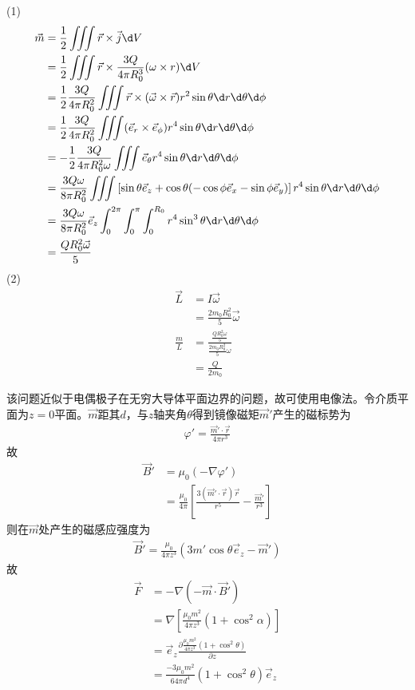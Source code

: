 \documentclass{phyasgn}
\begin{document}
\begin{sol}[2]
    (1)
    \begin{align*}
        \vec{m}&=\frac{1}{2}\iiint\vec{r}\times\vec{j}\d V\\
        &=\frac{1}{2}\iiint\vec{r}\times\frac{3Q}{4\pi R_0^3}(\omega\times r)\d V\\
        &=\frac{1}{2}\frac{3Q}{4\pi R_0^2}\iiint\vec{r}\times(\vec{\omega}\times\vec{r})r^2\sin\theta\d r\d\theta\d\phi\\
        &=\frac{1}{2}\frac{3Q}{4\pi R_0^2}\iiint(\vec{e}_r\times\vec{e}_\phi)r^4\sin\theta\d r\d\theta\d\phi\\
        &=-\frac{1}{2}\frac{3Q}{4\pi R_0^2\omega}\iiint\vec{e}_\theta r^4\sin\theta\d r\d\theta\d\phi\\
        &=\frac{3Q\omega}{8\pi R_0^2}\iiint\left[\sin\theta\vec{e}_z+\cos\theta(-\cos\phi\vec{e}_x-\sin\phi\vec{e}_y)\right] r^4\sin\theta\d r\d\theta\d\phi\\
        &=\frac{3Q\omega}{8\pi R_0^2}\vec{e}_z\int_{0}^{2\pi}\int_{0}^{\pi}\int_{0}^{R_0}r^4\sin^3\theta\d r\d\theta\d\phi\\
        &=\frac{QR_0^2\vec{\omega}}{5}
    \end{align*}
    (2)
    \begin{align*}
        \vec{L}&=I\vec{\omega}\\
        &=\frac{2m_0R_0^2}{5}\vec{\omega}\\
        \frac{m}{L}&=\frac{\frac{QR_0^2\omega}{5}}{\frac{2m_0R_0^2}{5}\omega}\\
        &=\frac{Q}{2m_0}
    \end{align*}
\end{sol}

\begin{sol}[2]
    该问题近似于电偶极子在无穷大导体平面边界的问题，故可使用电像法。令介质平面为$z=0$平面。$\vec{m}$距其$d$，与$z$轴夹角$\theta$得到镜像磁矩$\vec{m}'$产生的磁标势为
    \begin{align*}
        \varphi'=\frac{\vec{m}'\cdot\vec{r}}{4\pi r^3}
    \end{align*}
    故
    \begin{align*}
        \vec{B}'&=\mu_0(-\nabla\varphi')\\
        &=\frac{\mu_0}{4\pi}\left[\frac{3(\vec{m}'\cdot\vec{r})\vec{r}}{r^5}-\frac{\vec{m}'}{r^3}\right]
    \end{align*}
    则在$\vec{m}$处产生的磁感应强度为
    \begin{align*}
        \vec{B}'=\frac{\mu_0}{4\pi z^3}(3m'\cos\theta\vec{e}_z-\vec{m}')
    \end{align*}
    故
    \begin{align*}
        \vec{F}&=-\nabla(-\vec{m}\cdot\vec{B}')\\
        &=\nabla[\frac{\mu_0m^2}{4\pi z^3}(1+\cos^2\alpha)]\\
        &=\vec{e}_z\frac{\partial\frac{\mu_0m^2}{4\pi z^3}(1+\cos^2\theta)}{\partial z}\\
        &=\frac{-3\mu_0m^2}{64\pi d^4}(1+\cos^2\theta)\vec{e}_z
    \end{align*}
\end{sol}
\end{document}

